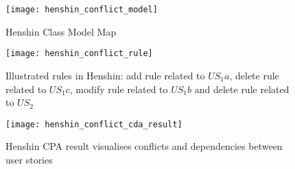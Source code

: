 \begin{example}
\begin{figure}
\center
\texttt{[image: henshin\_conflict\_model]}
\caption{Henshin Class Model Map}\label{fig:conflict_model}
\end{figure}
\begin{figure}
\center
\texttt{[image: henshin\_conflict\_rule]}
\caption{Illustrated rules in Henshin: add rule related to $US_1a$, delete rule related to $US_1c$, modify rule related to $US_1b$ and delete rule related to $US_2$ }\label{fig:conflict_rule}
\end{figure}
\begin{figure}
\center
\texttt{[image: henshin\_conflict\_cda\_result]}
\caption{Henshin CPA result visualises conflicts and dependencies between user stories}\label{fig:conflict_cda}
\end{figure}
\end{example}



